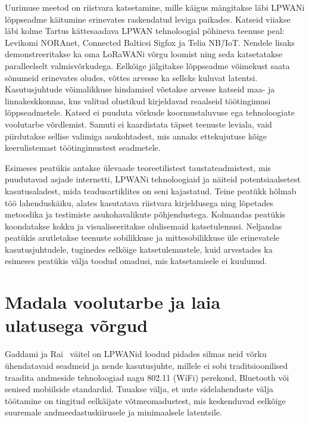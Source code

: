\documentclass[12pt]{article}
\begin{document}
    Uurimuse meetod on riistvara katsetamine, mille käigus mängitakse läbi LPWANi lõppseadme käitumine erinevates raskendatud leviga paikades.
    Katseid viiakse läbi kolme Tartus kättesaadava LPWAN tehnoloogial põhineva teenuse peal: Levikomi NORAnet, Connected Balticsi Sigfox ja Telia NB\=/IoT.
    Nendele lisaks demonstreeritakse ka oma LoRaWANi võrgu loomist ning seda katsetatakse paralleelselt valmisvõrkudega.
    Eelkõige jälgitakse lõppseadme võimekust saata sõnumeid erinevates oludes, võttes arvesse ka selleks kuluvat latentsi.
    Kasutusjuhtude võimalikkuse hindamisel võetakse arvesse katseid maa- ja linnakeskkonnas, kus valitud olustikud kirjeldavad reaalseid töötingimusi lõppseadmetele.
    Katsed ei puuduta võrkude koormustaluvuse ega tehnoloogiate voolutarbe võrdlemist.
    Samuti ei kaardistata täpset teenuste leviala, vaid piirdutakse sellise valimiga asukohtadest, mis annaks ettekujutuse kõige keerulistemast töötingimustest seadmetele.

    Esimeses peatükis antakse ülevaade teoreetilistest taustateadmistest, mis puudutavad asjade internetti, LPWANi tehnoloogiaid ja näiteid potentsiaalsetest kasutusaladest, mida teadusartiklites on seni kajastatud.
    Teine peatükk hõlmab töö lahenduskäiku, alates kasutatava riistvara kirjeldusega ning lõpetades metoodika ja testimiste asukohavalikute põhjendustega.
    Kolmandas peatükis koondatakse kokku ja visualiseeritakse olulisemaid katsetulemusi.
    Neljandas peatükis arutletakse teenuste sobilikkuse ja mittesobilikkuse üle erinevatele kasutusjuhtudele, tuginedes eelkõige katsetulemustele, kuid arvestades ka esimeses peatükis välja toodud omadusi, mis katsetamisele ei kuulunud.

    \newpage

    \section{Madala voolutarbe ja laia ulatusega võrgud}

    Gaddami ja Rai~\cite{gaddam2018comparative} väitel on LPWANid loodud pidades silmas neid võrku ühendatavaid seadmeid ja nende kasutusjuhte, millele ei sobi traditsioonilised traadita andmeside tehnoloogiad nagu 802.11 (WiFi) perekond, Bluetooth või senised mobiilside standardid.
    Tuuakse välja, et uute sidelahenduste välja töötamine on tingitud eelkäijate võtmeomadustest, mis keskenduvad eelkõige suuremale andmeedastuskiirusele ja minimaalsele latentsile.
\end{document}
